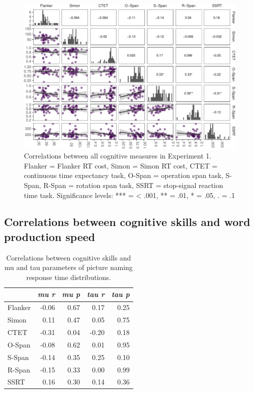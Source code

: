 \documentclass[
  man,floatsintext]{apa6}
\begin{document}
\begin{figure}
\centering
\includegraphics{task_difficulty_ind_dif_files/figure-latex/cogskillscor-1.pdf}
\caption{\label{fig:cogskillscor}Correlations between all cognitive measures in Experiment 1. Flanker = Flanker RT cost, Simon = Simon RT cost, CTET = continuous time expectancy task, O-Span = operation span task, S-Span, R-Span = rotation span task, SSRT = stop-signal reaction time task. Significance levels: *** = \textless{} .001, ** = .01, * = .05, . = .1}
\end{figure}

\hypertarget{correlations-between-cognitive-skills-and-word-production-speed}{%
\subsection{Correlations between cognitive skills and word production speed}\label{correlations-between-cognitive-skills-and-word-production-speed}}

\begin{table}

\caption{\label{tab:cormutau}Correlations between cognitive skills and mu and tau parameters of picture naming response time distributions.}
\centering
\begin{tabular}[t]{lrrrr}
\toprule
\em{ } & \em{mu r} & \em{mu p} & \em{tau r} & \em{tau p}\\
\midrule
Flanker & -0.06 & 0.67 & 0.17 & 0.25\\
Simon & 0.11 & 0.47 & 0.05 & 0.75\\
CTET & -0.31 & 0.04 & -0.20 & 0.18\\
O-Span & -0.08 & 0.62 & 0.01 & 0.95\\
S-Span & -0.14 & 0.35 & 0.25 & 0.10\\
\addlinespace
R-Span & -0.15 & 0.33 & 0.00 & 0.99\\
SSRT & 0.16 & 0.30 & 0.14 & 0.36\\
\bottomrule
\end{tabular}
\end{table}
\end{document}
